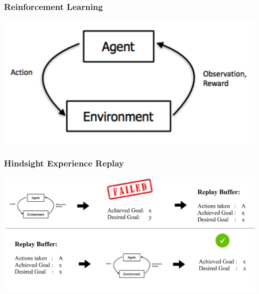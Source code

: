





\begin{frame}
	\frametitle{Reinforcement Learning}	
	\vspace{1cm}

    \includegraphics[width=\textwidth, height=.55\textheight]{./Ressourcen/Figures/reinforcementlearning.pdf}%

\end{frame}
\clearpage






\begin{frame}
	\frametitle{Hindsight Experience Replay}	
	\vspace{1cm}
	
	\includegraphics[width=\textwidth, height=.55\textheight]{./Ressourcen/Figures/her.pdf}%
	
\end{frame}
\clearpage

